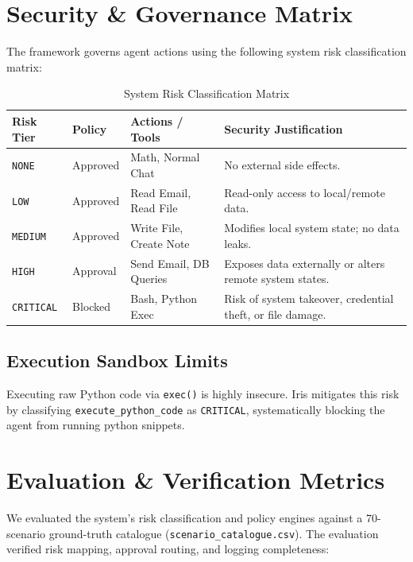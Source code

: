 \documentclass{article}
\begin{document}
\section{Security \& Governance Matrix}

The framework governs agent actions using the following system risk classification matrix:

\begin{table}[h!]
\centering
\begin{tabular}{lllp{6cm}}
\toprule
\textbf{Risk Tier} & \textbf{Policy} & \textbf{Actions / Tools} & \textbf{Security Justification} \\
\midrule
\texttt{NONE} & Approved & Math, Normal Chat & No external side effects. \\
\texttt{LOW} & Approved & Read Email, Read File & Read-only access to local/remote data. \\
\texttt{MEDIUM} & Approved & Write File, Create Note & Modifies local system state; no data leaks. \\
\texttt{HIGH} & Approval & Send Email, DB Queries & Exposes data externally or alters remote system states. \\
\texttt{CRITICAL} & Blocked & Bash, Python Exec & Risk of system takeover, credential theft, or file damage. \\
\bottomrule
\end{tabular}
\caption{System Risk Classification Matrix}
\end{table}

\subsection{Execution Sandbox Limits}
Executing raw Python code via \texttt{exec()} is highly insecure. Iris mitigates this risk by classifying \texttt{execute\_python\_code} as \texttt{CRITICAL}, systematically blocking the agent from running python snippets.

\section{Evaluation \& Verification Metrics}

We evaluated the system's risk classification and policy engines against a 70-scenario ground-truth catalogue (\texttt{scenario\_catalogue.csv}). The evaluation verified risk mapping, approval routing, and logging completeness:
\end{document}
